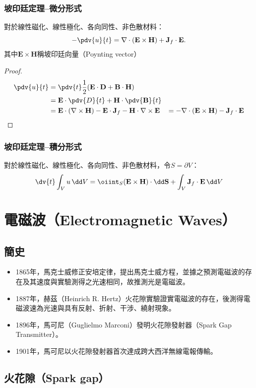\documentclass[a4paper,12pt]{report}
\begin{document}
\begin{itemize}
\subsubsection{坡印廷定理–微分形式}
對於線性磁化、線性極化、各向同性、非色散材料：
\[-\pdv{u}{t}=\nabla\cdot(\mathbf{E}\times\mathbf{H})+\mathbf{J}_f\cdot\mathbf{E}.\]
其中$\mathbf{E}\times\mathbf{H}$稱坡印廷向量（Poynting vector）
\begin{proof}
\[\begin{aligned}
\pdv{u}{t}&=\pdv{t}\frac{1}{2}(\mathbf{E}\cdot\mathbf{D}+\mathbf{B}\cdot\mathbf{H})\\
&=\mathbf{E}\cdot\pdv{D}{t}+\mathbf{H}\cdot\pdv{\mathbf{B}}{t}\\
&=\mathbf{E}\cdot(\nabla\times\mathbf{H})-\mathbf{E}\cdot\mathbf{J}_f-\mathbf{H}\cdot\nabla \times \mathbf{E}
&=-\nabla\cdot(\mathbf{E}\times\mathbf{H})-\mathbf{J}_f\cdot\mathbf{E}
\end{aligned}\]
\end{proof}
\subsubsection{坡印廷定理–積分形式}
對於線性磁化、線性極化、各向同性、非色散材料，令$S=\partial V$：
\[\dv{t}\int_Vu\,\dd V=\oiint_S(\mathbf{E}\times\mathbf{H})\cdot\dd\mathbf{S}+\int_V\mathbf{J}_f\cdot\mathbf{E}\,\dd V\]


\section{電磁波（Electromagnetic Waves）}
\subsection{簡史}
\begin{itemize}
\item 1865年，馬克士威修正安培定律，提出馬克士威方程，並據之預測電磁波的存在及其速度與實驗測得之光速相同，故推測光是電磁波。
\item 1887年，赫茲（Heinrich R. Hertz）火花隙實驗證實電磁波的存在，後測得電磁波速為光速與具有反射、折射、干涉、繞射現象。
\item 1896年，馬可尼（Guglielmo Marconi）發明火花隙發射器（Spark Gap Transmitter）。
\item 1901年，馬可尼以火花隙發射器首次達成跨大西洋無線電報傳輸。
\end{itemize}
\subsection{火花隙（Spark gap）}

\end{itemize}
\end{document}
